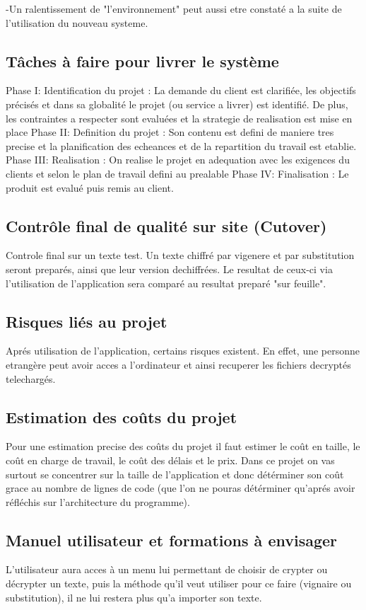 \documentclass[a4]{article}
\begin{document}
		-Un ralentissement de "l'environnement" peut aussi etre constaté a la suite de l'utilisation du nouveau systeme.
		\subsection{Tâches à faire pour livrer le système}
		Phase I: Identification du projet : La demande du client est clarifiée, les objectifs précisés et dans sa globalité le projet (ou service a livrer) est identifié. De plus, les contraintes a respecter sont evaluées et la strategie de realisation est mise en place
		Phase II: Definition du projet : Son contenu est defini de maniere tres precise et la planification des echeances et de la repartition du travail est etablie.
		Phase III: Realisation : On realise le projet en adequation avec les exigences du clients et selon le plan de travail defini au prealable
		Phase IV: Finalisation : Le produit est evalué puis remis au client.
		
		
		
		\subsection{Contrôle final de qualité sur site (Cutover)}
		Controle final sur un texte test. Un texte chiffré par vigenere et par substitution seront preparés, ainsi que leur version dechiffrées. Le resultat de ceux-ci via l'utilisation de l'application sera comparé au resultat preparé "sur feuille". 
		\subsection{Risques liés au projet}
		Aprés utilisation de l'application, certains risques existent. En effet, une personne etrangère peut avoir acces a l'ordinateur et ainsi recuperer les fichiers decryptés telechargés.
		\subsection{Estimation des coûts du projet}
		 	Pour une estimation precise des coûts du projet il faut estimer le coût en taille, 
			le coût en charge de travail, le coût des délais et le prix. Dans ce projet on vas surtout 
			se concentrer sur la taille de l'application et donc détérminer son coût grace au nombre de 
			lignes de code (que l'on ne pouras détérminer qu'aprés avoir réfléchis sur l'architecture du 				programme).		  		
		\subsection{Manuel utilisateur et formations à envisager}
			L'utilisateur aura acces à un menu lui permettant de choisir de crypter ou décrypter un texte,
			puis la méthode qu'il veut utiliser pour ce faire (vignaire ou substitution), il ne lui restera 
			plus qu'a importer son texte.
\end{document}
